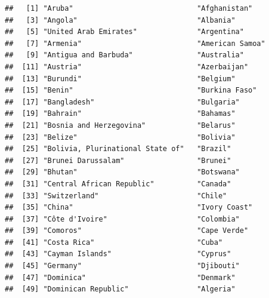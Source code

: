 \documentclass[]{article}
\newenvironment{Shaded}{\begin{snugshade}}{\end{snugshade}}
\newcommand{\ControlFlowTok}[1]{\textcolor[rgb]{0.13,0.29,0.53}{\textbf{#1}}}
\newcommand{\DecValTok}[1]{\textcolor[rgb]{0.00,0.00,0.81}{#1}}
\newcommand{\KeywordTok}[1]{\textcolor[rgb]{0.13,0.29,0.53}{\textbf{#1}}}
\newcommand{\NormalTok}[1]{#1}
\newcommand{\OperatorTok}[1]{\textcolor[rgb]{0.81,0.36,0.00}{\textbf{#1}}}
\newcommand{\StringTok}[1]{\textcolor[rgb]{0.31,0.60,0.02}{#1}}
\begin{document}
\begin{Shaded}
\end{Shaded}

\begin{verbatim}
##   [1] "Aruba"                             "Afghanistan"                      
##   [3] "Angola"                            "Albania"                          
##   [5] "United Arab Emirates"              "Argentina"                        
##   [7] "Armenia"                           "American Samoa"                   
##   [9] "Antigua and Barbuda"               "Australia"                        
##  [11] "Austria"                           "Azerbaijan"                       
##  [13] "Burundi"                           "Belgium"                          
##  [15] "Benin"                             "Burkina Faso"                     
##  [17] "Bangladesh"                        "Bulgaria"                         
##  [19] "Bahrain"                           "Bahamas"                          
##  [21] "Bosnia and Herzegovina"            "Belarus"                          
##  [23] "Belize"                            "Bolivia"                          
##  [25] "Bolivia, Plurinational State of"   "Brazil"                           
##  [27] "Brunei Darussalam"                 "Brunei"                           
##  [29] "Bhutan"                            "Botswana"                         
##  [31] "Central African Republic"          "Canada"                           
##  [33] "Switzerland"                       "Chile"                            
##  [35] "China"                             "Ivory Coast"                      
##  [37] "Côte d'Ivoire"                     "Colombia"                         
##  [39] "Comoros"                           "Cape Verde"                       
##  [41] "Costa Rica"                        "Cuba"                             
##  [43] "Cayman Islands"                    "Cyprus"                           
##  [45] "Germany"                           "Djibouti"                         
##  [47] "Dominica"                          "Denmark"                          
##  [49] "Dominican Republic"                "Algeria"                          

\end{verbatim}
\end{document}
